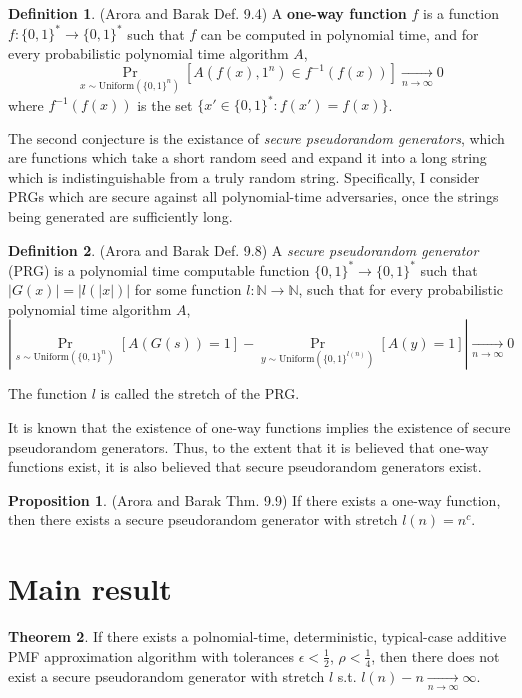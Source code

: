 \documentclass{article}
\theoremstyle{definition}
\newtheorem{defn}{Definition}
\newtheorem{thm}{Theorem}
\newtheorem{prop}[thm]{Proposition}
\theoremstyle{remark}
\begin{document}
\begin{defn}{(Arora and Barak Def. 9.4)}
A \textbf{one-way function} $f$ is a function $f : \{0, 1\}^* \to \{0, 1\}^*$ such that $f$ can be computed in polynomial time, and for every probabilistic polynomial time algorithm $A$,
$$
\Pr_{x \sim \text{Uniform}(\{0, 1\}^n)}[A(f(x), 1^n) \in f^{-1}(f(x))] \underset{n \to \infty}{\to} 0
$$
where $f^{-1}(f(x))$ is the set $\{x' \in \{0, 1\}^* : f(x') = f(x)\}$.
\end{defn}

The second conjecture is the existance of \textit{secure pseudorandom generators}, which are functions which take a short random seed and expand it into a long string which is indistinguishable from a truly random string.
Specifically, I consider PRGs which are secure against all polynomial-time adversaries, once the strings being generated are sufficiently long.

\begin{defn}{(Arora and Barak Def. 9.8)}
A \textit{secure pseudorandom generator} (PRG) is a polynomial time computable function $\{0, 1\}^* \to \{0, 1\}^*$ such that $|G(x)| = |l(|x|)|$ for some function $l : \mathbb{N} \to \mathbb{N}$, such that for every probabilistic polynomial time algorithm $A$,
$$
|\Pr_{s \sim \text{Uniform}(\{0, 1\}^n)}[A(G(s)) = 1] - \Pr_{y \sim \text{Uniform}(\{0, 1\}^{l(n)})}[A(y) = 1]| \underset{n \to \infty}{\to} 0
$$

The function $l$ is called the stretch of the PRG.
\end{defn}

It is known that the existence of one-way functions implies the existence of secure pseudorandom generators.
Thus, to the extent that it is believed that one-way functions exist, it is also believed that secure pseudorandom generators exist.
\begin{prop}{(Arora and Barak Thm. 9.9)}
If there exists a one-way function, then there exists a secure pseudorandom generator with stretch $l(n) = n^c$.
\end{prop}

\section{Main result}
\begin{thm} \label{thm:main}
If there exists a polnomial-time, deterministic, typical-case additive PMF approximation algorithm with tolerances $\epsilon < \frac{1}{2}$, $\rho < \frac{1}{4}$,
then there does not exist a secure pseudorandom generator with stretch $l$ s.t. $l(n) - n \underset{n \to \infty}{\to} \infty$.
\end{thm}
\end{document}
